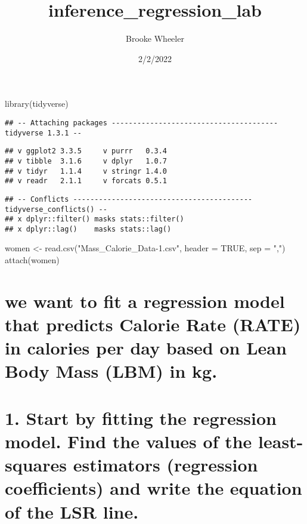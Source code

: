 \documentclass[
]{article}
\title{inference\_regression\_lab}
\author{Brooke Wheeler}
\date{2/2/2022}
\newenvironment{Shaded}{\begin{snugshade}}{\end{snugshade}}
\newcommand{\AttributeTok}[1]{\textcolor[rgb]{0.77,0.63,0.00}{#1}}
\newcommand{\ConstantTok}[1]{\textcolor[rgb]{0.00,0.00,0.00}{#1}}
\newcommand{\FunctionTok}[1]{\textcolor[rgb]{0.00,0.00,0.00}{#1}}
\newcommand{\NormalTok}[1]{#1}
\newcommand{\OtherTok}[1]{\textcolor[rgb]{0.56,0.35,0.01}{#1}}
\newcommand{\StringTok}[1]{\textcolor[rgb]{0.31,0.60,0.02}{#1}}
\begin{document}
\maketitle

\begin{Shaded}
\begin{Highlighting}[]
\FunctionTok{library}\NormalTok{(tidyverse)}
\end{Highlighting}
\end{Shaded}

\begin{verbatim}
## -- Attaching packages --------------------------------------- tidyverse 1.3.1 --
\end{verbatim}

\begin{verbatim}
## v ggplot2 3.3.5     v purrr   0.3.4
## v tibble  3.1.6     v dplyr   1.0.7
## v tidyr   1.1.4     v stringr 1.4.0
## v readr   2.1.1     v forcats 0.5.1
\end{verbatim}

\begin{verbatim}
## -- Conflicts ------------------------------------------ tidyverse_conflicts() --
## x dplyr::filter() masks stats::filter()
## x dplyr::lag()    masks stats::lag()
\end{verbatim}

\begin{Shaded}
\begin{Highlighting}[]
\NormalTok{women }\OtherTok{\textless{}{-}} \FunctionTok{read.csv}\NormalTok{(}\StringTok{"Mass\_Calorie\_Data{-}1.csv"}\NormalTok{, }\AttributeTok{header =} \ConstantTok{TRUE}\NormalTok{, }\AttributeTok{sep =} \StringTok{","}\NormalTok{)}
\FunctionTok{attach}\NormalTok{(women)}
\end{Highlighting}
\end{Shaded}

\hypertarget{we-want-to-fit-a-regression-model-that-predicts-calorie-rate-rate-in-calories-per-day-based-on-lean-body-mass-lbm-in-kg.}{%
\section{we want to fit a regression model that predicts Calorie Rate
(RATE) in calories per day based on Lean Body Mass (LBM) in
kg.}\label{we-want-to-fit-a-regression-model-that-predicts-calorie-rate-rate-in-calories-per-day-based-on-lean-body-mass-lbm-in-kg.}}

\hypertarget{start-by-fitting-the-regression-model.-find-the-values-of-the-least-squares-estimators-regression-coefficients-and-write-the-equation-of-the-lsr-line.}{%
\section{1. Start by fitting the regression model. Find the values of
the least-squares estimators (regression coefficients) and write the
equation of the LSR
line.}\label{start-by-fitting-the-regression-model.-find-the-values-of-the-least-squares-estimators-regression-coefficients-and-write-the-equation-of-the-lsr-line.}}
\end{document}
